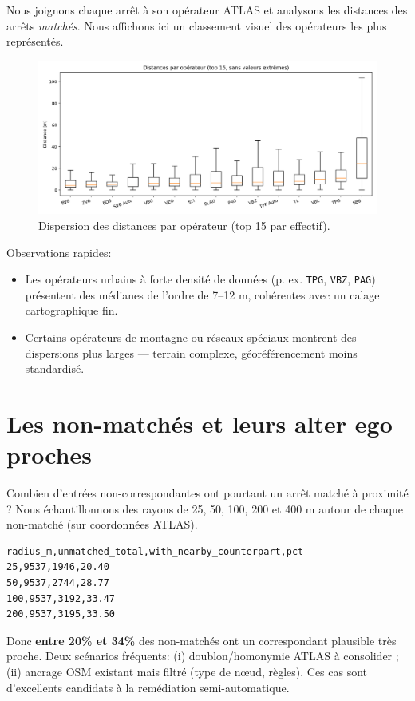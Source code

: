 Nous joignons chaque arrêt à son opérateur ATLAS et analysons les distances des arrêts 
\textit{matchés}. Nous affichons ici un classement visuel des opérateurs les plus représentés.

\begin{figure}[h]
    \centering
    \includegraphics[width=\textwidth]{../figures/chap5/distances_by_operator_box.png}
    \caption[Distances par opérateur]{Dispersion des distances par opérateur (top 15 par effectif).}
\end{figure}

Observations rapides:
\begin{itemize}
    \item Les opérateurs urbains à forte densité de données (p. ex. \texttt{TPG}, \texttt{VBZ}, \texttt{PAG}) présentent des médianes de l'ordre de 7–12 m, cohérentes avec un calage cartographique fin.
    \item Certains opérateurs de montagne ou réseaux spéciaux montrent des dispersions plus larges — terrain complexe, géoréférencement moins standardisé.
\end{itemize}

\section{Les non-matchés et leurs \og alter ego \fg{} proches}

Combien d'entrées non-correspondantes ont pourtant un arrêt matché à proximité ? Nous échantillonnons 
des rayons de 25, 50, 100, 200 et 400 m autour de chaque non-matché (sur coordonnées ATLAS).

\begin{verbatim}
radius_m,unmatched_total,with_nearby_counterpart,pct
25,9537,1946,20.40
50,9537,2744,28.77
100,9537,3192,33.47
200,9537,3195,33.50
\end{verbatim}

Donc \textbf{entre 20\% et 34\%} des non-matchés ont un correspondant plausible très proche. Deux scénarios fréquents: (i) doublon/homonymie ATLAS à consolider ; (ii) ancrage OSM 
existant mais filtré (type de nœud, règles). Ces cas sont d'excellents candidats à la remédiation semi-automatique.

